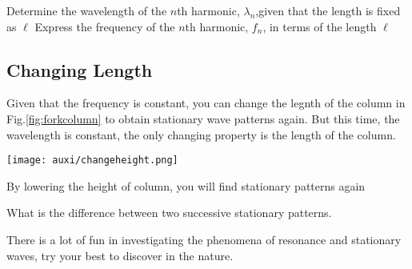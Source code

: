 \documentclass[a4paper]{tufte-handout}
\newenvironment{TaskBox} %
{\begin{tcolorbox}[breakable,colback=b1!30,colframe=b1,title=Task]} {\end{tcolorbox}}
\begin{document}
\begin{TaskBox}
Determine the wavelength of the $n$th harmonic, $\lambda_n$,given that the length is fixed as $\ell$
\vspace{0.5in}
\tcblower
Express the frequency of the $n$th harmonic, $f_n$, in terms of the length $\ell$
\vspace{0.5in}
\end{TaskBox}


\subsection{Changing Length}
Given that the frequency is constant, you can change the legnth of the column in Fig.\ref{fig:forkcolumn} to obtain stationary wave patterns again. But this time, the wavelength is constant, the only changing property is the length of the column.
\begin{marginfigure}
\centering
\texttt{[image: auxi/changeheight.png]}
\caption{By lowering the height of column, you will find stationary patterns again}
\end{marginfigure}

\begin{TaskBox}
What is the difference between two successive stationary patterns.
\vspace{0.5in}
\end{TaskBox}

There is a lot of fun in investigating the phenomena of resonance and stationary waves, try your best to discover in the nature.
\end{document}
